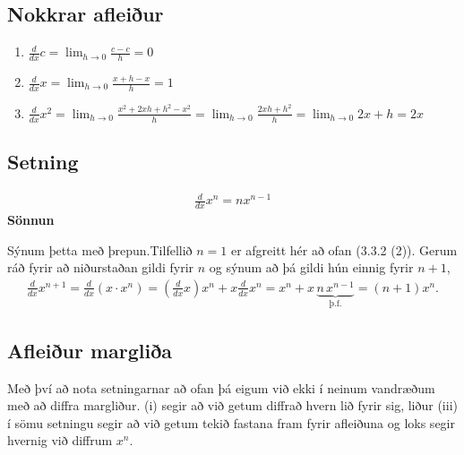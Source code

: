 \documentclass[b5paper,11pt,icelandic]{sphinxmanual}
\begin{document}
\subsection{Nokkrar afleiður}
\label{kafli03:setning-3-3-2}\label{kafli03:nokkrar-afleiur}\begin{enumerate}
\item {} 
\(\frac{d}{dx} c =  \lim_{h\to 0} \frac{c-c}h = 0\)

\item {} 
\(\frac{d}{dx} x =  \lim_{h\to 0} \frac{x+h-x}h = 1\)

\item {} 
\(\frac{d}{dx} x^2 = \lim_{h\to 0} \frac{x^2+2xh+h^2-x^2}h
= \lim_{h\to 0} \frac{2xh + h^2}h = \lim_{h\to 0} 2x+h= 2x\)

\end{enumerate}


\subsection{Setning}
\label{kafli03:id5}\label{kafli03:setning-3-3-3}\begin{equation*}
\begin{split}\frac{d}{dx} x^n = n x^{n-1}\end{split}
\end{equation*}
\textbf{Sönnun}

Sýnum þetta með þrepun.Tilfellið \(n=1\) er afgreitt hér að ofan
(3.3.2 (2)).
Gerum ráð fyrir að niðurstaðan gildi fyrir \(n\) og sýnum að þá
gildi hún einnig fyrir \(n+1\),
\begin{equation*}
\begin{split}\frac{d}{dx} x^{n+1} = \frac{d}{dx} (x\cdot x^n) =
    \left(\frac{d}{dx} x\right) x^n + x\frac{d}{dx} x^n
    = x^n + x\,
    \underbrace{n\, x^{n-1}}_\text{þ.f.}
    = (n+1) x^n.\end{split}
\end{equation*}

\subsection{Afleiður margliða}
\label{kafli03:afleiur-marglia}
Með því að nota setningarnar að ofan þá eigum við ekki í neinum
vandræðum með að diffra margliður. {\hyperref[kafli03:setning\string-3\string-3\string-1]{}} (i) segir
að við getum diffrað hvern lið fyrir sig, liður (iii) í sömu setningu
segir að við getum tekið fastana fram fyrir afleiðuna og loks segir
{\hyperref[kafli03:setning\string-3\string-3\string-3]{}} hvernig við diffrum \(x^n\).
\end{document}
